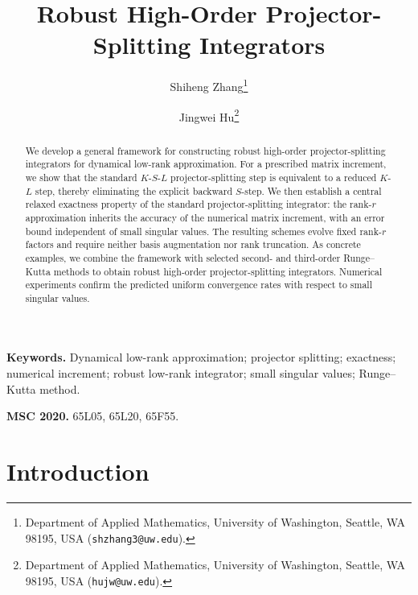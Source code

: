 \documentclass[]{article}
\numberwithin{equation}{section}
\theoremstyle{plain}
\theoremstyle{remark}
\numberwithin{algorithm}{section}
\begin{document}
\title{Robust High-Order Projector-Splitting Integrators}
\author{Shiheng Zhang\thanks{Department of Applied Mathematics,
University of Washington, Seattle, WA 98195, USA
(\texttt{shzhang3@uw.edu}).}
\and
Jingwei Hu\thanks{Department of Applied Mathematics,
University of Washington, Seattle, WA 98195, USA
(\texttt{hujw@uw.edu}).}}
\date{}

\maketitle

\begin{abstract}
We develop a general framework for constructing robust high-order projector-splitting
integrators for dynamical low-rank approximation. For a prescribed matrix increment, we show that the standard \(K\)-\(S\)-\(L\) projector-splitting step \cite{LubichOseledets2014} is equivalent to a reduced \(K\)-\(L\) step, thereby eliminating the explicit
backward \(S\)-step. We then establish a central relaxed exactness property of the standard
projector-splitting integrator: the rank-$r$ approximation inherits the accuracy of the numerical matrix increment, with an error bound independent of small singular values. The resulting schemes evolve fixed rank-\(r\) factors and require neither basis augmentation nor rank truncation.
As concrete examples, we combine the framework with selected second- and third-order Runge--Kutta methods to obtain robust high-order projector-splitting integrators.
Numerical experiments confirm the predicted uniform convergence rates with respect to small singular values.
\end{abstract}

\medskip
\noindent\textbf{Keywords.}
Dynamical low-rank approximation; projector splitting; exactness; numerical
increment; robust low-rank integrator; small singular values; Runge--Kutta
method.

\smallskip
\noindent\textbf{MSC 2020.} 65L05, 65L20, 65F55.

\section{Introduction}
\label{sec:introduction}
\end{document}
